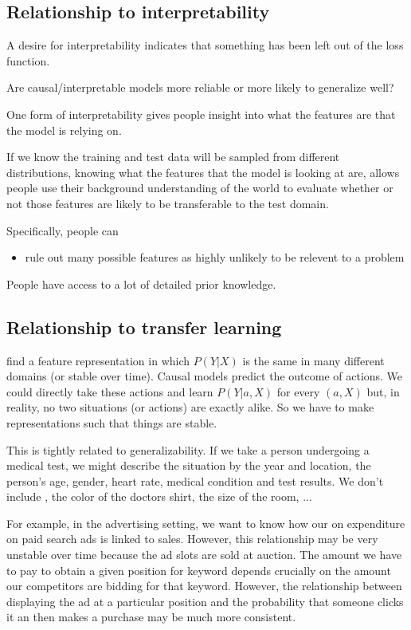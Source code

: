 \documentclass[11pt,a4paper]{article}
\begin{document}
\subsection*{Relationship to interpretability}

A desire for interpretability indicates that something has been left out of the loss function. 

Are causal/interpretable models more reliable or more likely to generalize well? 

One form of interpretability gives people insight into what the features are that the model is relying on. 

If we know the training and test data will be sampled from different distributions, knowing what the features that the model is looking at are, allows people use their background understanding of the world to evaluate whether or not those features are likely to be transferable to the test domain. 

Specifically, people can
\begin{itemize}
\item rule out many possible features as highly unlikely to be relevent to a problem
\end{itemize}

People have access to a lot of detailed prior knowledge. 

\subsection*{Relationship to transfer learning}

find a feature representation in which $P(Y|X)$ is the same in many different domains (or stable over time). Causal models predict the outcome of actions. We could directly take these actions and learn $P(Y|a,X)$ for every $(a,X)$ but, in reality, no two situations (or actions) are exactly alike. So we have to make representations such that things are stable. 

This is tightly related to generalizability. If we take a person undergoing a medical test, we might describe the situation by the year and location, the person's age, gender, heart rate, medical condition and test results. We don't include , the color of the doctors shirt, the size of the room, ...

For example, in the advertising setting, we want to know how our on expenditure on paid search ads is linked to sales. However, this relationship may be very unstable over time because the ad slots are sold at auction. The amount we have to pay to obtain a given position for keyword depends crucially on the amount our competitors are bidding for that keyword. However, the relationship between displaying the ad at a particular position and the probability that someone clicks it an then makes a purchase may be much more consistent. 
\end{document}
